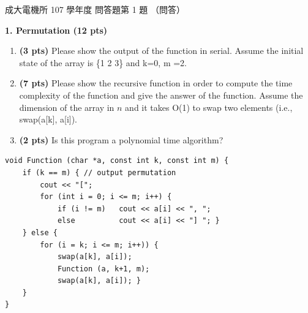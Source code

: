 \begin{pastexam}[label={px:ncku-107-ee-ds-05}]{成大電機所 107 學年度 問答題第 1 題}
（問答）

\textbf{1. Permutation (12 pts)}
\begin{enumerate}[label=\alph*.]
\item \textbf{(3 pts)} Please show the output of the function in serial. Assume the initial state of
the array is \{1 2 3\} and k=0, m =2.
\item \textbf{(7 pts)} Please show the recursive function in order to compute the time complexity of
the function and give the answer of the function. Assume the dimension of the array in $n$ and it
takes O(1) to swap two elements (i.e., swap(a[k], a[i]).
\item \textbf{(2 pts)} Is this program a polynomial time algorithm?
\end{enumerate}
\begin{verbatim}
void Function (char *a, const int k, const int m) {
    if (k == m) { // output permutation
        cout << "[";
        for (int i = 0; i <= m; i++) {
            if (i != m)   cout << a[i] << ", ";
            else          cout << a[i] << "] "; }
    } else {
        for (i = k; i <= m; i++)) {
            swap(a[k], a[i]);
            Function (a, k+1, m);
            swap(a[k], a[i]); }
    }
}
\end{verbatim}
\end{pastexam}

